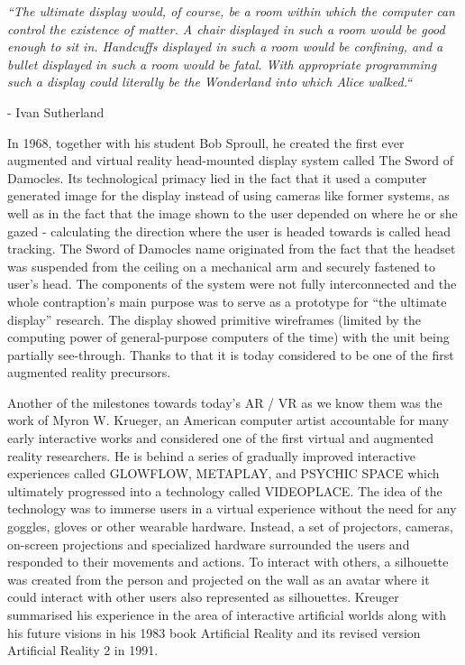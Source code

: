 \documentclass[12pt, a4paper]{article}
\begin{document}
\begin{displayquote}
\textit{“The ultimate display would, of course, be a room within which the computer can control the existence of matter. A chair displayed in such a room would be good enough to sit in. Handcuffs displayed in such a room would be confining, and a bullet displayed in such a room would be fatal. With appropriate programming such a display could literally be the Wonderland into which Alice walked.“}
\end{displayquote}
\begin{flushright}
- Ivan Sutherland
\end{flushright}

In 1968, together with his student Bob Sproull, he created the first ever augmented and virtual reality head-mounted display system called The Sword of Damocles. Its technological primacy lied in the fact that it used a computer generated image for the display instead of using cameras like former systems, as well as in the fact that the image shown to the user depended on where he or she gazed - calculating the direction where the user is headed towards is called head tracking. The Sword of Damocles name originated from the fact that the headset was suspended from the ceiling on a mechanical arm and securely fastened to user’s head. The components of the system were not fully interconnected and the whole contraption’s main purpose was to serve as a prototype for “the ultimate display” research. The display showed primitive wireframes (limited by the computing power of general-purpose computers of the time) with the unit being partially see-through. Thanks to that it is today considered to be one of the first augmented reality precursors.

Another of the milestones towards today’s AR / VR as we know them was the work of Myron W. Krueger, an American computer artist accountable for many early interactive works and considered one of the first virtual and augmented reality researchers. He is behind a series of gradually improved interactive experiences called GLOWFLOW, METAPLAY, and PSYCHIC SPACE which ultimately progressed into a technology called VIDEOPLACE. The idea of the technology was to immerse users in a virtual experience without the need for any goggles, gloves or other wearable hardware. Instead, a set of projectors, cameras, on-screen projections and specialized hardware surrounded the users and responded to their movements and actions. To interact with others, a silhouette was created from the person and projected on the wall as an avatar where it could interact with other users also represented as silhouettes. Kreuger summarised his experience in the area of interactive artificial worlds along with his future visions in his 1983 book Artificial Reality and its revised version Artificial Reality 2 in 1991.
\end{document}
